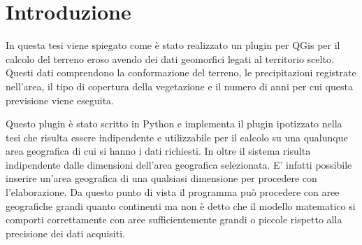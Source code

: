 
\cleardoublepage
{}

\chapter*{Introduzione}

In questa tesi viene spiegato come è stato realizzato un plugin per QGis per il calcolo del terreno eroso avendo dei dati geomorfici legati al territorio scelto. Questi dati comprendono la conformazione del terreno, le precipitazioni registrate nell'area, il tipo di copertura della vegetazione e il numero di anni per cui questa previsione viene eseguita.

Questo plugin è stato scritto in Python e implementa il plugin ipotizzato nella tesi \cite{tesi:ambientale} che risulta essere indipendente e utilizzabile per il calcolo su una qualunque area geografica di cui si hanno i dati richiesti. In oltre il sistema risulta indipendente dalle dimensioni dell'area geografica selezionata. E' infatti possibile inserire un'area geografica di una qualsiasi dimensione per procedere con l'elaborazione. Da questo punto di vista il programma può procedere con aree geografiche grandi quanto continenti ma non è detto che il modello matematico si comporti correttamente con aree sufficientemente grandi o piccole rispetto alla precisione dei dati acquisiti.